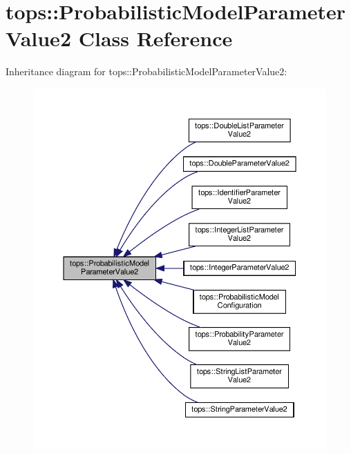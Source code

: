 \hypertarget{classtops_1_1ProbabilisticModelParameterValue2}{}\section{tops\+:\+:Probabilistic\+Model\+Parameter\+Value2 Class Reference}
\label{classtops_1_1ProbabilisticModelParameterValue2}


Inheritance diagram for tops\+:\+:Probabilistic\+Model\+Parameter\+Value2\+:
\nopagebreak
\begin{figure}[H]
\begin{center}
\leavevmode
\includegraphics[width=350pt]{classtops_1_1ProbabilisticModelParameterValue2__inherit__graph}
\end{center}
\end{figure}
